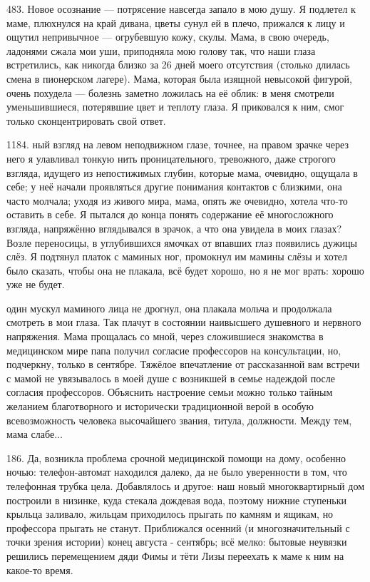483.
Новое осознание — потрясение навсегда запало в мою душу.
Я подлетел к маме, плюхнулся на край дивана, цветы сунул ей в плечо, прижался к лицу и ощутил непривычное — огрубевшую кожу, скулы. Мама, в свою очередь, ладонями сжала мои уши, приподняла мою голову так, что наши глаза встретились, как никогда близко за 26 дней моего отсутствия (столько длилась смена в пионерском лагере). Мама, которая была изящной невысокой фигурой, очень похудела — болезнь заметно ложилась на её облик: в меня смотрели уменьшившиеся, потерявшие цвет и теплоту глаза. Я приковался к ним, смог только сконцентрировать свой ответ.

1184. ный взгляд на левом неподвижном глазе, точнее, на правом зрачке через него я улавливал тонкую нить проницательного, тревожного, даже строгого взгляда, идущего из непостижимых глубин, которые мама, очевидно, ощущала в себе; у неё начали проявляться другие понимания контактов с близкими, она часто молчала; уходя из живого мира, мама, опять же очевидно, хотела что-то оставить в себе. Я пытался до конца понять содержание её многосложного взгляда, напряжённо вглядывался в зрачок, а что она увидела в моих глазах? Возле переносицы, в углубившихся ямочках от впавших глаз появились дужицы слёз. Я подтянул платок с маминых ног, промокнул им мамины слёзы и хотел было сказать, чтобы она не плакала, всё будет хорошо, но я не мог врать: хорошо уже не будет.

один мускул маминого лица не дрогнул, она плакала мольча и продолжала смотреть в мои глаза. Так плачут в состоянии наивысшего душевного и нервного напряжения. Мама прощалась со мной, через сложившиеся знакомства в медицинском мире папа получил согласие профессоров на консультации, но, подчеркну, только в сентябре. Тяжёлое впечатление от рассказанной вам встречи с мамой не увязывалось в моей душе с возникшей в семье надеждой после согласия профессоров. Объяснить настроение семьи можно только тайным желанием благотворного и исторически традиционной верой в особую всевозможность человека высочайшего звания, титула, должности. Между тем, мама слабе...

186. Да, возникла проблема срочной медицинской помощи на дому, особенно ночью: телефон-автомат находился далеко, да не было уверенности в том, что телефонная трубка цела. Добавлялось и другое: наш новый многоквартирный дом построили в низинке, куда стекала дождевая вода, поэтому нижние ступеньки крыльца заливало, жильцам приходилось прыгать по камням и ящикам, но профессора прыгать не станут. Приближался осенний (и многозначительный с точки зрения истории) конец августа - сентябрь; всё мелко: бытовые неувязки решились перемещением дяди Фимы и тёти Лизы переехать к маме к ним на какое-то время.

